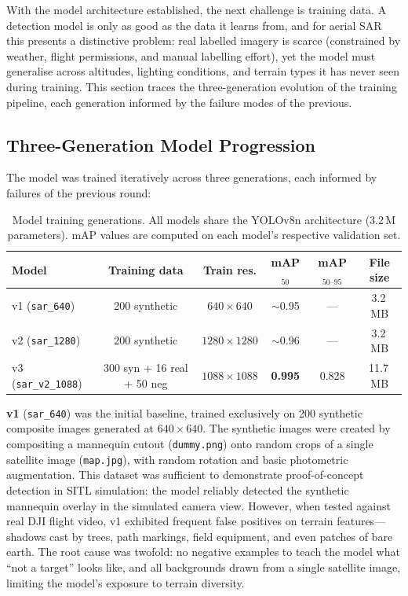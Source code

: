 \documentclass[10pt,a4paper]{article}
\begin{document}
With the model architecture established, the next challenge is training data. A detection model is only as good as the data it learns from, and for aerial SAR this presents a distinctive problem: real labelled imagery is scarce (constrained by weather, flight permissions, and manual labelling effort), yet the model must generalise across altitudes, lighting conditions, and terrain types it has never seen during training. This section traces the three-generation evolution of the training pipeline, each generation informed by the failure modes of the previous.

\subsection{Three-Generation Model Progression}\label{sec:training:generations}

The model was trained iteratively across three generations, each informed by failures of the previous round:

\begin{table}[ht]
  \centering
  \caption{Model training generations. All models share the YOLOv8n architecture (3.2\,M parameters). mAP values are computed on each model's respective validation set.}\label{tab:model-generations}
  \begin{tabular}{@{}l c c c c c@{}}
    \toprule
    \textbf{Model} & \textbf{Training data} & \textbf{Train res.} & \textbf{mAP$_{50}$} & \textbf{mAP$_{50\text{--}95}$} & \textbf{File size} \\
    \midrule
    v1 (\texttt{sar\_640})     & 200 synthetic              & $640 \times 640$   & ${\sim}$0.95     & ---          & 3.2\,MB  \\
    v2 (\texttt{sar\_1280})    & 200 synthetic              & $1280 \times 1280$ & ${\sim}$0.96     & ---          & 3.2\,MB  \\
    v3 (\texttt{sar\_v2\_1088}) & 300 syn + 16 real + 50 neg & $1088 \times 1088$ & \textbf{0.995}   & 0.828        & 11.7\,MB \\
    \bottomrule
  \end{tabular}
\end{table}

\textbf{v1} (\texttt{sar\_640}) was the initial baseline, trained exclusively on 200 synthetic composite images generated at $640 \times 640$. The synthetic images were created by compositing a mannequin cutout (\texttt{dummy.png}) onto random crops of a single satellite image (\texttt{map.jpg}), with random rotation and basic photometric augmentation. This dataset was sufficient to demonstrate proof-of-concept detection in SITL simulation: the model reliably detected the synthetic mannequin overlay in the simulated camera view. However, when tested against real DJI flight video, v1 exhibited frequent false positives on terrain features---shadows cast by trees, path markings, field equipment, and even patches of bare earth. The root cause was twofold: no negative examples to teach the model what ``not a target'' looks like, and all backgrounds drawn from a single satellite image, limiting the model's exposure to terrain diversity.
\end{document}
